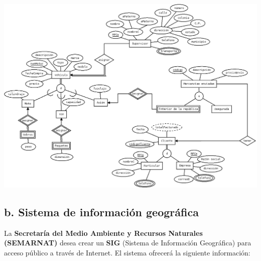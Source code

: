 \documentclass[12pt, letterpaper]{article}
\begin{document}
            \includegraphics[scale=0.4]{empresa_envios.png}

        \subsection*{b. Sistema de información geográfica}

        La \textbf{Secretaría del Medio Ambiente y Recursos Naturales (SEMARNAT)} desea 
        crear un \textbf{SIG} (Sistema de Información Geográfica) para acceso público a 
        través de Internet. El sistema ofrecerá la siguiente información:
\end{document}
